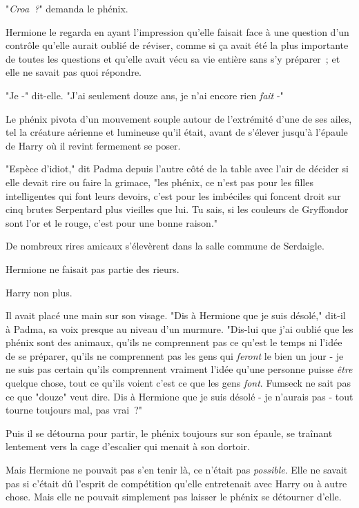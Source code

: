 "\emph{Croa~?}" demanda le phénix.

Hermione le regarda en ayant l'impression qu'elle faisait face à une question d'un contrôle qu'elle aurait oublié de réviser, comme si ça avait été la plus importante de toutes les questions et qu'elle avait vécu sa vie entière sans s'y préparer~; et elle ne savait pas quoi répondre.

"Je -" dit-elle. "J'ai seulement douze ans, je n'ai encore rien \emph{fait} -"

Le phénix pivota d'un mouvement souple autour de l'extrémité d'une de ses ailes, tel la créature aérienne et lumineuse qu'il était, avant de s'élever jusqu'à l'épaule de Harry où il revint fermement se poser.

"Espèce d'idiot," dit Padma depuis l'autre côté de la table avec l'air de décider si elle devait rire ou faire la grimace, "les phénix, ce n'est pas pour les filles intelligentes qui font leurs devoirs, c'est pour les imbéciles qui foncent droit sur cinq brutes Serpentard plus vieilles que lui. Tu sais, si les couleurs de Gryffondor sont l'or et le rouge, c'est pour une bonne raison."

De nombreux rires amicaux s'élevèrent dans la salle commune de Serdaigle.

Hermione ne faisait pas partie des rieurs.

Harry non plus.

Il avait placé une main sur son visage. "Dis à Hermione que je suis désolé," dit-il à Padma, sa voix presque au niveau d'un murmure. "Dis-lui que j'ai oublié que les phénix sont des animaux, qu'ils ne comprennent pas ce qu'est le temps ni l'idée de se préparer, qu'ils ne comprennent pas les gens qui \emph{feront} le bien un jour - je ne suis pas certain qu'ils comprennent vraiment l'idée qu'une personne puisse \emph{être} quelque chose, tout ce qu'ils voient c'est ce que les gens \emph{font}. Fumseck ne sait pas ce que "douze" veut dire. Dis à Hermione que je suis désolé - je n'aurais pas - tout tourne toujours mal, pas vrai~?"

Puis il se détourna pour partir, le phénix toujours sur son épaule, se traînant lentement vers la cage d'escalier qui menait à son dortoir.

Mais Hermione ne pouvait pas s'en tenir là, ce n'était pas \emph{possible}. Elle ne savait pas si c'était dû l'esprit de compétition qu'elle entretenait avec Harry ou à autre chose. Mais elle ne pouvait simplement pas laisser le phénix se détourner d'elle.

